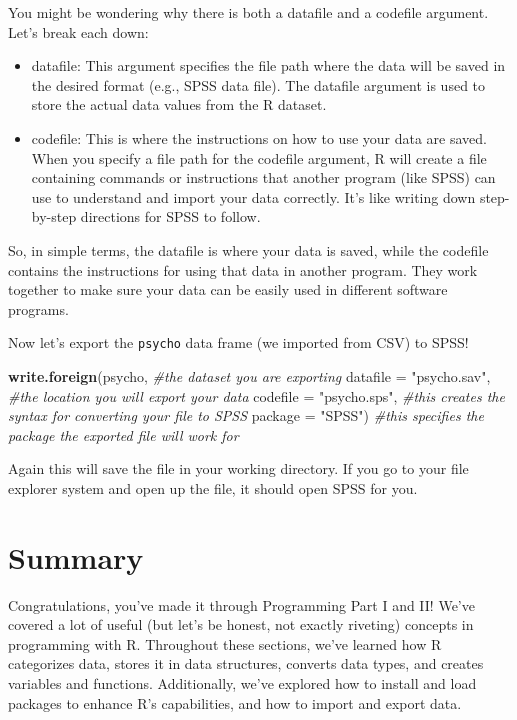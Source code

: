 \documentclass[
]{book}
\newenvironment{Shaded}{\begin{snugshade}}{\end{snugshade}}
\newcommand{\AttributeTok}[1]{\textcolor[rgb]{0.13,0.29,0.53}{#1}}
\newcommand{\CommentTok}[1]{\textcolor[rgb]{0.56,0.35,0.01}{\textit{#1}}}
\newcommand{\FunctionTok}[1]{\textcolor[rgb]{0.13,0.29,0.53}{\textbf{#1}}}
\newcommand{\NormalTok}[1]{#1}
\newcommand{\StringTok}[1]{\textcolor[rgb]{0.31,0.60,0.02}{#1}}
\begin{document}
You might be wondering why there is both a datafile and a codefile argument. Let's break each down:

\begin{itemize}
\item
  datafile: This argument specifies the file path where the data will be saved in the desired format (e.g., SPSS data file). The datafile argument is used to store the actual data values from the R dataset.
\item
  codefile: This is where the instructions on how to use your data are saved. When you specify a file path for the codefile argument, R will create a file containing commands or instructions that another program (like SPSS) can use to understand and import your data correctly. It's like writing down step-by-step directions for SPSS to follow.
\end{itemize}

So, in simple terms, the datafile is where your data is saved, while the codefile contains the instructions for using that data in another program. They work together to make sure your data can be easily used in different software programs.

Now let's export the \texttt{psycho} data frame (we imported from CSV) to SPSS!

\begin{Shaded}
\begin{Highlighting}[]
\FunctionTok{write.foreign}\NormalTok{(psycho, }\CommentTok{\#the dataset you are exporting}
              \AttributeTok{datafile =} \StringTok{"psycho.sav"}\NormalTok{, }\CommentTok{\#the location you will export your data}
              \AttributeTok{codefile =} \StringTok{"psycho.sps"}\NormalTok{, }\CommentTok{\#this creates the syntax for converting your file to SPSS}
              \AttributeTok{package =} \StringTok{"SPSS"}\NormalTok{) }\CommentTok{\#this specifies the package the exported file will work for}
\end{Highlighting}
\end{Shaded}

Again this will save the file in your working directory. If you go to your file explorer system and open up the file, it should open SPSS for you.

\hypertarget{summary-4}{%
\section{Summary}\label{summary-4}}

Congratulations, you've made it through Programming Part I and II! We've covered a lot of useful (but let's be honest, not exactly riveting) concepts in programming with R. Throughout these sections, we've learned how R categorizes data, stores it in data structures, converts data types, and creates variables and functions. Additionally, we've explored how to install and load packages to enhance R's capabilities, and how to import and export data.
\end{document}
